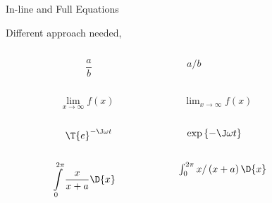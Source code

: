 \documentclass[xcolor=dvipsnames, aspectratio=169, handout, intlimits]{beamer}
\begin{document}
\begin{frame}{In-line and Full Equations}

\vspace{-0.5cm}
Different approach needed, \cf{}

\begin{columns}
	\begin{column}{0.5\textwidth}	
\begin{equation*}
\frac{a}{b}
\end{equation*}
	\end{column}
	\begin{column}{0.5\textwidth}	
$a/b$
	\end{column}
\end{columns}

\begin{columns}
\begin{column}{0.5\textwidth}	
	\begin{equation*}
	\lim\limits_{x\rightarrow \infty} f \left(x\right)
	\end{equation*}
\end{column}
\begin{column}{0.5\textwidth}	
	$\lim_{x\rightarrow \infty} f \left(x\right)$
\end{column}
\end{columns}

\begin{columns}
\begin{column}{0.5\textwidth}	
	\begin{equation*}
	\T{e}^{-\J\omega t}
	\end{equation*}
\end{column}
\begin{column}{0.5\textwidth}	
	$\exp\left\{-\J\omega t\right\}$
\end{column}
\end{columns}

\begin{columns}
	\begin{column}{0.5\textwidth}	
		\begin{equation*}
		\int\limits_0^{2 \pi} \frac{x}{x + a} \D{x}
		\end{equation*}
	\end{column}
	\begin{column}{0.5\textwidth}	
		$\int_0^{2\pi} x / \left(x + a\right) \D{x}$
	\end{column}
\end{columns}

\vspace{0.25cm}

\end{frame}
\end{document}
